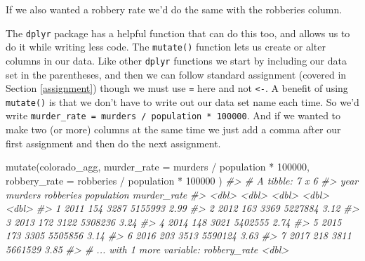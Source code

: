 \documentclass[
]{krantz}
\makeatletter
\newenvironment{Shaded}{\begin{snugshade}}{\end{snugshade}}
\newcommand{\AttributeTok}[1]{\textcolor[rgb]{0.61,0.61,0.61}{#1}}
\newcommand{\CommentTok}[1]{\textcolor[rgb]{0.37,0.37,0.37}{\textit{#1}}}
\newcommand{\DecValTok}[1]{\textcolor[rgb]{0.06,0.06,0.06}{#1}}
\newcommand{\FunctionTok}[1]{\textcolor[rgb]{0,0,0}{#1}}
\newcommand{\NormalTok}[1]{#1}
\newcommand{\OtherTok}[1]{\textcolor[rgb]{0.37,0.37,0.37}{#1}}
\newcommand{\SpecialCharTok}[1]{\textcolor[rgb]{0,0,0}{#1}}
\newenvironment{kframe}{%
\medskip{}
\setlength{\fboxsep}{.8em}
 \def\at@end@of@kframe{}%
 \ifinner\ifhmode%
  \def\at@end@of@kframe{\end{minipage}}%
  \begin{minipage}{\columnwidth}%
 \fi\fi%
 \def\FrameCommand##1{\hskip\@totalleftmargin \hskip-\fboxsep
 \colorbox{shadecolor}{##1}\hskip-\fboxsep
     \hskip-\linewidth \hskip-\@totalleftmargin \hskip\columnwidth}%
 \MakeFramed {\advance\hsize-\width
   \@totalleftmargin\z@ \linewidth\hsize
   \@setminipage}}%
 {\par\unskip\endMakeFramed%
 \at@end@of@kframe}
\renewenvironment{Shaded}{\begin{kframe}}{\end{kframe}}
\makeatother
\begin{document}
If we also wanted a robbery rate we'd do the same with the
robberies column.

\begin{Shaded}
\end{Shaded}

The \texttt{dplyr} package has a helpful function that can
do this too, and allows us to do it while writing less code.
The \texttt{mutate()} function lets us create or alter
columns in our data. Like other \texttt{dplyr} functions we
start by including our data set in the parentheses, and then
we can follow standard assignment (covered in Section
\ref{assignment}) though we must use \texttt{=} here and not
\texttt{\textless{}-}. A benefit of using \texttt{mutate()}
is that we don't have to write out our data set name each
time. So we'd write
\texttt{murder\_rate\ =\ murders\ /\ population\ *\ 100000}.
And if we wanted to make two (or more) columns at the same
time we just add a comma after our first assignment and then
do the next assignment.

\begin{Shaded}
\begin{Highlighting}[]
\FunctionTok{mutate}\NormalTok{(colorado\_agg,}
  \AttributeTok{murder\_rate  =}\NormalTok{ murders }\SpecialCharTok{/}\NormalTok{ population }\SpecialCharTok{*} \DecValTok{100000}\NormalTok{,}
  \AttributeTok{robbery\_rate =}\NormalTok{ robberies }\SpecialCharTok{/}\NormalTok{ population }\SpecialCharTok{*} \DecValTok{100000}
\NormalTok{)}
\CommentTok{\#\textgreater{} \# A tibble: 7 x 6}
\CommentTok{\#\textgreater{}    year murders robberies population murder\_rate}
\CommentTok{\#\textgreater{}   \textless{}dbl\textgreater{}   \textless{}dbl\textgreater{}     \textless{}dbl\textgreater{}      \textless{}dbl\textgreater{}       \textless{}dbl\textgreater{}}
\CommentTok{\#\textgreater{} 1  2011     154      3287    5155993        2.99}
\CommentTok{\#\textgreater{} 2  2012     163      3369    5227884        3.12}
\CommentTok{\#\textgreater{} 3  2013     172      3122    5308236        3.24}
\CommentTok{\#\textgreater{} 4  2014     148      3021    5402555        2.74}
\CommentTok{\#\textgreater{} 5  2015     173      3305    5505856        3.14}
\CommentTok{\#\textgreater{} 6  2016     203      3513    5590124        3.63}
\CommentTok{\#\textgreater{} 7  2017     218      3811    5661529        3.85}
\CommentTok{\#\textgreater{} \# ... with 1 more variable: robbery\_rate \textless{}dbl\textgreater{}}
\end{Highlighting}
\end{Shaded}
\end{document}
